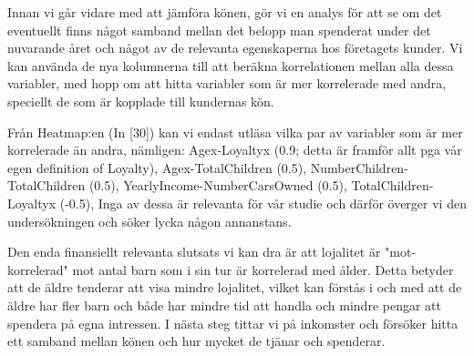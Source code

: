 \documentclass[10pt]{article}
\begin{document}
Innan vi går vidare med att jämföra könen, gör vi en analys för att se om det eventuellt finns något samband mellan det belopp man spenderat under det nuvarande året och något av de relevanta egenskaperna hos företagets kunder. Vi kan använda de nya kolumnerna till att beräkna korrelationen mellan alla dessa variabler, med hopp om att hitta variabler som är mer korrelerade med andra, speciellt de som är kopplade till kundernas kön.

Från Heatmap:en (In [30]) kan vi endast utläsa vilka par av variabler som är mer korrelerade än andra, nämligen: Agex-Loyaltyx (0.9; detta är framför allt pga vår egen definition of Loyalty), Agex-TotalChildren (0.5), NumberChildren-TotalChildren (0.5), YearlyIncome-NumberCarsOwned (0.5), TotalChildren-Loyaltyx (-0.5), Inga av dessa är relevanta för vår studie och därför överger vi den undersökningen och söker lycka någon annanstans.

Den enda finansiellt relevanta slutsats vi kan dra är att lojalitet är "mot-korrelerad" mot antal barn som i sin tur är korrelerad med ålder. Detta betyder att de äldre tenderar att visa mindre lojalitet, vilket kan förstås i och med att de äldre har fler barn och både har mindre tid att handla och mindre pengar att spendera på egna intressen. I nästa steg tittar vi på inkomster och försöker hitta ett samband mellan könen och hur mycket de tjänar och spenderar.
\end{document}
